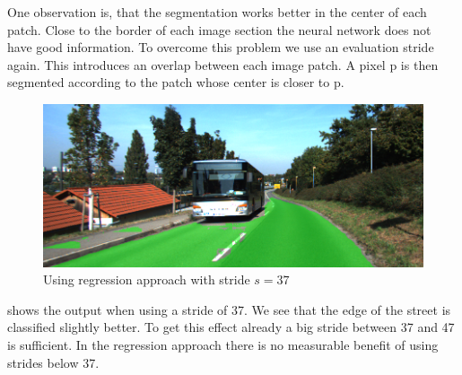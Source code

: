 One observation is, that the segmentation works better in the center of each patch. Close to the border of each image section the neural network does not have good information. To overcome this problem we use an evaluation stride again. This introduces an overlap between each image patch. A pixel p is then segmented according to the patch whose center is closer to p.




\begin{figure}[]
	\centering
	\includegraphics[width=\columnwidth]{figures/models/testing2-um_32_conv_stride37.png}
	\caption{Using regression approach with stride $s=37$}
	\label{fig:reg_stride37}
\end{figure}

 shows the output when using a stride of 37. We see that the edge of the street is classified slightly better. To get this effect already a big stride between 37 and 47 is sufficient. In the regression approach there is no measurable benefit of using strides below 37.

